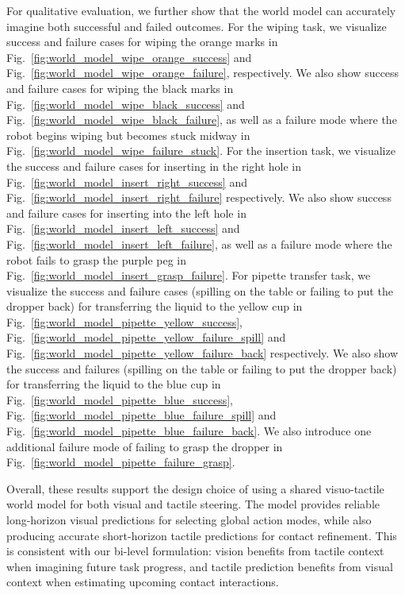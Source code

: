For qualitative evaluation, we further show that the world model can accurately imagine both successful and failed outcomes. For the wiping task, we visualize success and failure cases for wiping the orange marks in Fig.~\ref{fig:world_model_wipe_orange_success} and Fig.~\ref{fig:world_model_wipe_orange_failure}, respectively. We also show success and failure cases for wiping the black marks in Fig.~\ref{fig:world_model_wipe_black_success} and Fig.~\ref{fig:world_model_wipe_black_failure}, as well as a failure mode where the robot begins wiping but becomes stuck midway in Fig.~\ref{fig:world_model_wipe_failure_stuck}. For the insertion task, we visualize the success and failure cases for inserting in the right hole in Fig.~\ref{fig:world_model_insert_right_success} and Fig.~\ref{fig:world_model_insert_right_failure} respectively. We also show success and failure cases for inserting into the left hole in Fig.~\ref{fig:world_model_insert_left_success} and Fig.~\ref{fig:world_model_insert_left_failure}, as well as a failure mode where the robot fails to grasp the purple peg in Fig.~\ref{fig:world_model_insert_grasp_failure}. For pipette transfer task, we visualize the success and failure cases (spilling on the table or failing to put the dropper back) for transferring the liquid to the yellow cup in Fig.~\ref{fig:world_model_pipette_yellow_success}, Fig.~\ref{fig:world_model_pipette_yellow_failure_spill} and Fig.~\ref{fig:world_model_pipette_yellow_failure_back} respectively. We also show the success and failures (spilling on the table or failing to put the dropper back) for transferring the liquid to the blue cup in Fig.~\ref{fig:world_model_pipette_blue_success}, Fig.~\ref{fig:world_model_pipette_blue_failure_spill} and Fig.~\ref{fig:world_model_pipette_blue_failure_back}. We also introduce one additional failure mode of failing to grasp the dropper in Fig.~\ref{fig:world_model_pipette_failure_grasp}.

Overall, these results support the design choice of using a shared visuo-tactile world model for both visual and tactile steering. The model provides reliable long-horizon visual predictions for selecting global action modes, while also producing accurate short-horizon tactile predictions for contact refinement. This is consistent with our bi-level formulation: vision benefits from tactile context when imagining future task progress, and tactile prediction benefits from visual context when estimating upcoming contact interactions.

